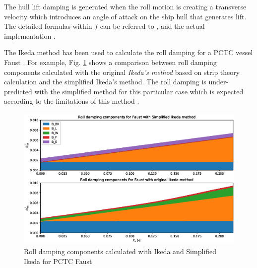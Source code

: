 

The hull lift damping is generated when the roll motion is creating a transverse velocity which introduces an angle of attack on the ship hull that generates lift.     
The detailed formulas within $f$ can be referred to \parencite{kawahara_simple_2011}, \parencite{ikeda_velocity_1979} and the actual implementation \parencite{alexandersson_martinlarsalbertrolldecay-estimators_2020}.




The Ikeda method has been used to calculate the roll damping for a PCTC vessel Faust \parencite{soder_assessment_2019}. For example, Fig. \ref{fig:ikeda_vs_simplified} shows a comparison between roll damping components calculated with the original \emph{Ikeda's method} based on strip theory calculation and the simplified Ikeda's method. The roll damping is under-predicted with the simplified method for this particular case which is expected according to the limitations of this method  \parencite{kawahara_simple_2011}.

\begin{figure}[H]
    \centering
    \includegraphics[height=7cm, width=14cm]{figures/ikeda_vs_simplified.eps}
    \caption{Roll damping components calculated with Ikeda and Simplified Ikeda for PCTC Faust}
    \label{fig:ikeda_vs_simplified}
\end{figure}


